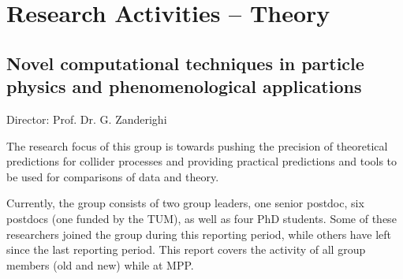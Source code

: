 \documentclass{FBR_Bericht_2025}
\begin{document}
\onecolumn
{}
\tableofcontents
\cleardoublepage

\twocolumn

\chapter{Research Activities -- Theory}
\section[Novel computational techniques in particle physics and phenomenological applications]{Novel computational techniques in particle physics and phenomenological applications}
\begin{Namen}
Director: Prof. Dr. G. Zanderighi
\end{Namen}

{\color{red}{RG: The research focus of this group is the development of tools and methods which push the theoretical precision of collider physics predictions and event simulations, enabling more detailed comparisons between theory and experimental measurements.}}

The research focus of this group is towards pushing the precision of
theoretical predictions for collider processes and providing
practical predictions and tools to be used for comparisons of data and
theory.

Currently, the group consists of two group leaders, one senior
postdoc, six postdocs (one funded by the TUM), as well as
four PhD students. Some of these researchers joined the group during this
reporting period, while others have left since the last reporting
period. This report covers the activity of all group members (old and new) while at MPP. 


\end{document}
